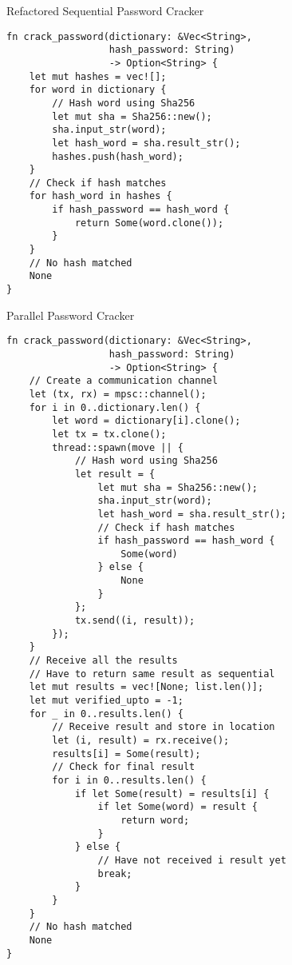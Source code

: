\documentclass[conference]{IEEEtran}
\begin{document}
\begin{algorithm}
\caption{Refactored Sequential Password Cracker}
\label{code:seq-refactor-password}
\begin{verbatim}
fn crack_password(dictionary: &Vec<String>,
                  hash_password: String)
                  -> Option<String> {
    let mut hashes = vec![];
    for word in dictionary {
        // Hash word using Sha256
        let mut sha = Sha256::new();
        sha.input_str(word);
        let hash_word = sha.result_str();
        hashes.push(hash_word);
    }
    // Check if hash matches
    for hash_word in hashes {
        if hash_password == hash_word {
            return Some(word.clone());
        }
    }
    // No hash matched
    None
}
\end{verbatim}
\end{algorithm}

\begin{algorithm}
\caption{Parallel Password Cracker}
\label{code:par-password}
\begin{verbatim}
fn crack_password(dictionary: &Vec<String>,
                  hash_password: String)
                  -> Option<String> {
    // Create a communication channel
    let (tx, rx) = mpsc::channel();
    for i in 0..dictionary.len() {
        let word = dictionary[i].clone();
        let tx = tx.clone();
        thread::spawn(move || {
            // Hash word using Sha256
            let result = {
                let mut sha = Sha256::new();
                sha.input_str(word);
                let hash_word = sha.result_str();
                // Check if hash matches
                if hash_password == hash_word {
                    Some(word)
                } else {
                    None
                }
            };
            tx.send((i, result));
        });
    }
    // Receive all the results
    // Have to return same result as sequential
    let mut results = vec![None; list.len()];
    let mut verified_upto = -1;
    for _ in 0..results.len() {
        // Receive result and store in location
        let (i, result) = rx.receive();
        results[i] = Some(result);
        // Check for final result
        for i in 0..results.len() {
            if let Some(result) = results[i] {
                if let Some(word) = result {
                    return word;
                }
            } else {
                // Have not received i result yet
                break;
            }
        }
    }
    // No hash matched
    None
}
\end{verbatim}
\end{algorithm}
\end{document}
